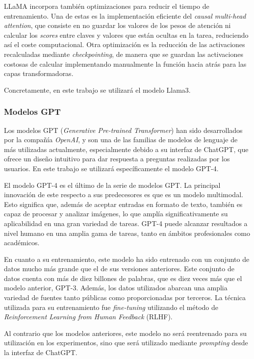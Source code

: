 \documentclass[11pt,spanish,listoffigures,listoftables]{tfgetsinf}
\begin{document}
LLaMA incorpora también optimizaciones para reducir el tiempo de entrenamiento. Una de estas es la implementación eficiente del \textit{causal multi-head attention}, que consiste en no guardar los valores de los pesos de atención ni calcular los \textit{scores} entre claves y valores que están ocultas en la tarea, reduciendo así el coste computacional. Otra optimización es la reducción de las activaciones recalculadas mediante \textit{checkpointing}, de manera que se guardan las activaciones costosas de calcular implementando manualmente la función hacia atrás para las capas transformadoras.

Concretamente, en este trabajo se utilizará el modelo Llama3.

\subsubsection{Modelos GPT}

Los modelos GPT (\textit{Generative Pre-trained Transformer}) han sido desarrollados por la compañía \textit{OpenAI}, y son una de las familias de modelos de lenguaje de más utilizadas actualmente, especialmente debido a su interfaz de ChatGPT, que ofrece un diseño intuitivo para dar respuesta a preguntas realizadas por los usuarios. En este trabajo se utilizará específicamente el modelo GPT-4.

El modelo GPT-4 \cite{openai2024gpt4technicalreport} es el último de la serie de modelos GPT. La principal innovación de este respecto a sus predecesores es que es un modelo multimodal. Esto significa que, además de aceptar entradas en formato de texto, también es capaz de procesar y analizar imágenes, lo que amplía significativamente su aplicabilidad en una gran variedad de tareas. GPT-4 puede alcanzar resultados a nivel humano en una amplia gama de tareas, tanto en ámbitos profesionales como académicos.

En cuanto a su entrenamiento, este modelo ha sido entrenado con un conjunto de datos mucho más grande que el de sus versiones anteriores. Este conjunto de datos cuenta con más de diez billones de palabras, que es diez veces más que el modelo anterior, GPT-3. Además, los datos utilizados abarcan una amplia variedad de fuentes tanto públicas como proporcionadas por terceros. La técnica utilizada para su entrenamiento fue \textit{fine-tuning} utilizando el método de \textit{Reinforcement Learning from Human Feedback} (RLHF).

Al contrario que los modelos anteriores, este modelo no será reentrenado para su utilización en los experimentos, sino que será utilizado mediante \textit{prompting} desde la interfaz de ChatGPT.
\end{document}
